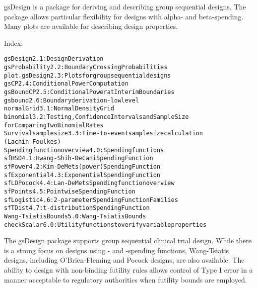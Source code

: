 \begin{Description}\relax
gsDesign is a package for deriving and describing group sequential designs.
The package allows particular flexibility for designs with alpha- and beta-spending.
Many plots are available for describing design properties.
\end{Description}
\begin{Details}\relax
{}

Index:
\begin{alltt}
gsDesign                2.1: Design Derivation
gsProbability           2.2: Boundary Crossing Probabilities
plot.gsDesign           2.3: Plots for group sequential designs
gsCP                    2.4: Conditional Power Computation
gsBoundCP               2.5: Conditional Power at Interim Boundaries
gsbound                 2.6: Boundary derivation - low level
normalGrid              3.1: Normal Density Grid
binomial                3.2: Testing, Confidence Intervals and Sample Size
                             for Comparing Two Binomial Rates
Survival sample size    3.3: Time-to-event sample size calculation
                             (Lachin-Foulkes)
Spending function overview      4.0: Spending functions
sfHSD                   4.1: Hwang-Shih-DeCani Spending Function
sfPower                 4.2: Kim-DeMets (power) Spending Function
sfExponential           4.3: Exponential Spending Function
sfLDPocock              4.4: Lan-DeMets Spending function overview
sfPoints                4.5: Pointwise Spending Function
sfLogistic              4.6: 2-parameter Spending Function Families
sfTDist                 4.7: t-distribution Spending Function
Wang-Tsiatis Bounds     5.0: Wang-Tsiatis Bounds
checkScalar             6.0: Utility functions to verify variable properties
\end{alltt}
The gsDesign package supports group sequential clinical trial design. 
While there is a strong focus on designs using - and -spending functions, Wang-Tsiatis designs, 
including O'Brien-Fleming and Pocock designs, are also available.
The ability to design with non-binding futility rules 
allows control of Type I error in a manner acceptable to regulatory authorities when futility bounds are employed. 


\end{Details}
